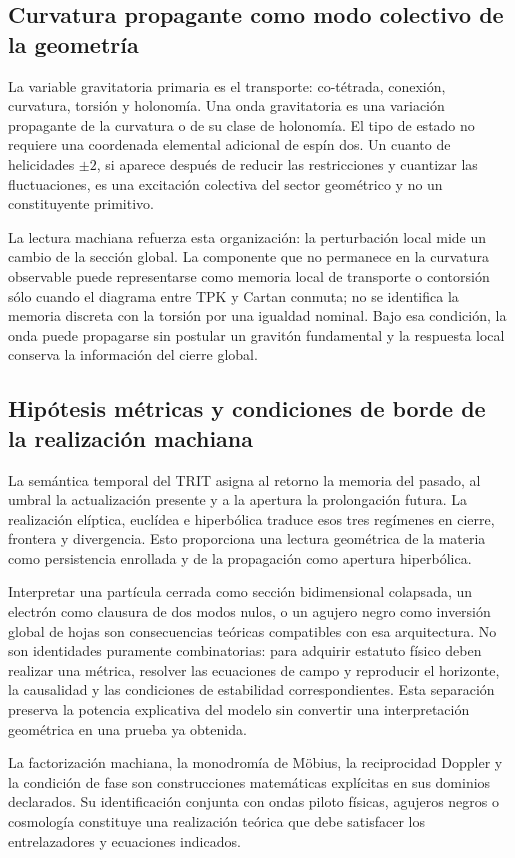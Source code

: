 \subsection{Curvatura propagante como modo colectivo de la geometría}

La variable gravitatoria primaria es el transporte: co-tétrada, conexión,
curvatura, torsión y holonomía. Una onda gravitatoria es una variación
propagante de la curvatura o de su clase de holonomía. El tipo de estado no
requiere una coordenada elemental adicional de espín dos. Un cuanto de
helicidades \(\pm2\), si aparece después de reducir las restricciones y
cuantizar las fluctuaciones, es una excitación colectiva del sector
geométrico y no un constituyente primitivo.

La lectura machiana refuerza esta organización: la perturbación local mide
un cambio de la sección global. La componente que no permanece en la
curvatura observable puede representarse como memoria local de transporte o
contorsión sólo cuando el diagrama entre TPK y Cartan conmuta; no se identifica
la memoria discreta con la torsión por una igualdad nominal. Bajo esa
condición, la onda puede propagarse sin postular un gravitón fundamental y
la respuesta local conserva la información del cierre global.

\subsection{Hipótesis métricas y condiciones de borde de la realización machiana}

La semántica temporal del TRIT asigna al retorno la memoria del pasado, al
umbral la actualización presente y a la apertura la prolongación futura. La
realización elíptica, euclídea e hiperbólica traduce esos tres regímenes en
cierre, frontera y divergencia. Esto proporciona una lectura geométrica de
la materia como persistencia enrollada y de la propagación como apertura
hiperbólica.

Interpretar una partícula cerrada como sección bidimensional colapsada, un
electrón como clausura de dos modos nulos, o un agujero negro como inversión
global de hojas son consecuencias teóricas compatibles con esa arquitectura.
No son identidades puramente combinatorias: para adquirir estatuto físico
deben realizar una métrica, resolver las ecuaciones de campo y reproducir el
horizonte, la causalidad y las condiciones de estabilidad correspondientes.
Esta separación preserva la potencia explicativa del modelo sin convertir
una interpretación geométrica en una prueba ya obtenida.

\begin{statusbox}
La factorización machiana, la monodromía de Möbius, la reciprocidad Doppler y
la condición de fase son construcciones matemáticas explícitas en sus
dominios declarados. Su identificación conjunta con ondas piloto físicas,
agujeros negros o cosmología constituye una realización teórica que debe
satisfacer los entrelazadores y ecuaciones indicados.
\end{statusbox}
